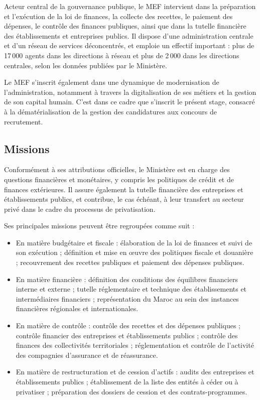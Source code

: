 \begin{onehalfspace}
Acteur central de la gouvernance publique, le MEF intervient dans la préparation et l'exécution de la loi de finances, la collecte des recettes, le paiement des dépenses, le contrôle des finances publiques, ainsi que dans la tutelle financière des établissements et entreprises publics. Il dispose d'une administration centrale et d'un réseau de services déconcentrés, et emploie un effectif important : plus de 17\,000 agents dans les directions à réseau et plus de 2\,000 dans les directions centrales, selon les données publiées par le Ministère.

Le MEF s'inscrit également dans une dynamique de modernisation de l'administration, notamment à travers la digitalisation de ses métiers et la gestion de son capital humain. C'est dans ce cadre que s'inscrit le présent stage, consacré à la dématérialisation de la gestion des candidatures aux concours de recrutement.

\subsection{Missions}

Conformément à ses attributions officielles, le Ministère est en charge des questions financières et monétaires, y compris les politiques de crédit et de finances extérieures. Il assure également la tutelle financière des entreprises et établissements publics, et contribue, le cas échéant, à leur transfert au secteur privé dans le cadre du processus de privatisation.

Ses principales missions peuvent être regroupées comme suit :

\begin{itemize}
  \item En matière budgétaire et fiscale : élaboration de la loi de finances et suivi de son exécution ; définition et mise en œuvre des politiques fiscale et douanière ; recouvrement des recettes publiques et paiement des dépenses publiques.
  \item En matière financière : définition des conditions des équilibres financiers interne et externe ; tutelle réglementaire et technique des établissements et intermédiaires financiers ; représentation du Maroc au sein des instances financières régionales et internationales.
  \item En matière de contrôle : contrôle des recettes et des dépenses publiques ; contrôle financier des entreprises et établissements publics ; contrôle des finances des collectivités territoriales ; réglementation et contrôle de l'activité des compagnies d'assurance et de réassurance.
  \item En matière de restructuration et de cession d'actifs : audits des entreprises et établissements publics ; établissement de la liste des entités à céder ou à privatiser ; préparation des dossiers de cession et des contrats-programmes.
\end{itemize}


\end{onehalfspace}
